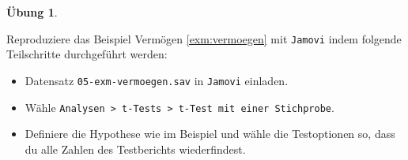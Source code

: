 \documentclass[
]{book}
\providecommand{\tightlist}{%
  \setlength{\itemsep}{0pt}\setlength{\parskip}{0pt}}
\theoremstyle{definition}
\theoremstyle{definition}
\theoremstyle{definition}
\newtheorem{exercise}{Übung}[chapter]
\theoremstyle{definition}
\theoremstyle{remark}
\begin{document}
\begin{exercise}
\protect\hypertarget{exr:vermoegen}{}\label{exr:vermoegen}\leavevmode

Reproduziere das Beispiel Vermögen \ref{exm:vermoegen} mit \texttt{Jamovi} indem folgende Teilschritte durchgeführt werden:

\begin{itemize}
\tightlist
\item
  Datensatz \texttt{05-exm-vermoegen.sav} in \texttt{Jamovi} einladen.
\item
  Wähle \texttt{Analysen\ \textgreater{}\ t-Tests\ \textgreater{}\ t-Test\ mit\ einer\ Stichprobe}.
\item
  Definiere die Hypothese wie im Beispiel und wähle die Testoptionen so, dass du alle Zahlen des Testberichts wiederfindest.
\end{itemize}

\end{exercise}
\end{document}
